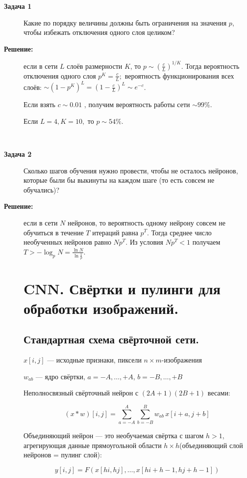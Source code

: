 \begin{description}
\item[\textbf{Задача 1}] 
    Какие по порядку величины должны быть ограничения на значения $p$, чтобы избежать отключения одного слоя целиком?
\item[\textbf{Решение:}] если в сети $L$ слоёв размерности $K$, то $p \sim (\frac{c}{L})^{1/K}. $
    Тогда вероятность отключения одного слоя $p^K = \frac{c}{L}; $ вероятность функционирования всех слоёв: $\sim (1-p^K)^L = (1-\frac{c}{L})^L \sim e^{-c}$.
    
    Если взять $c\sim 0.01$ , получим вероятность работы сети $\sim 99\%$.
    
    Если $L=4, K=10,$ то $p \sim 54\%$.

\

\item[\textbf{Задача 2}] 
    Сколько шагов обучения нужно провести, чтобы не осталось нейронов, которые были бы выкинуты на каждом шаге (то есть совсем не обучались)?

\item[\textbf{Решение:}] если в сети $N$ нейронов, то вероятность одному нейрону совсем не обучиться в течение $T$ итераций равна $p^T$. Тогда среднее число необученных нейронов равно $Np^T$. Из условия $Np^T<1$ получаем $T>-\log_{p}N = \frac{\ln N}{\ln \frac{1}{p}}$.

\section{CNN. Свёртки и пулинги для обработки изображений.}
\subsection{Стандартная схема свёрточной сети.}

$ x[i, j] $ — исходные признаки, пиксели $ n \times m $-изображения

$ w_{ab} $ — ядро свёртки, $ a = -A, \ldots, +A $, $ b = -B, \ldots, +B $

Неполносвязный свёрточный нейрон с $ (2A + 1)(2B + 1) $ весами:

$$
(x * w)[i, j] = \sum_{a=-A}^{A} \sum_{b=-B}^{B} w_{ab} \, x[i + a, j + b]
$$

Объединяющий нейрон — это необучаемая свёртка с шагом $ h > 1 $, агрегирующая данные прямоугольной области $ h \times h $(объединяющий слой нейронов = пулинг слой):

$$
y[i, j] = F \left( x[hi, hj], \ldots, x[hi + h - 1, hj + h - 1] \right)
$$


\end{description}

